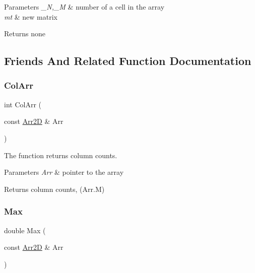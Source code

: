 \begin{DoxyParams}{Parameters}
{\em \+\_\+N,\+\_\+M} & number of a cell in the array \\
\hline
{\em mt} & new matrix \\
\hline
\end{DoxyParams}
\begin{DoxyReturn}{Returns}
none 
\end{DoxyReturn}


\subsection{Friends And Related Function Documentation}
\mbox{\label{class_arr2_d_a26461596a4c6662d3c715f23ea8ba89b}} 
\subsubsection{\texorpdfstring{Col\+Arr}{ColArr}}
{\footnotesize\ttfamily int Col\+Arr (\begin{DoxyParamCaption}\item[{const \mbox{\hyperlink{class_arr2_d}{Arr2D}} \&}]{Arr }\end{DoxyParamCaption})\hspace{0.3cm}{\ttfamily [friend]}}



The function returns column counts. 


\begin{DoxyParams}{Parameters}
{\em Arr} & pointer to the array \\
\hline
\end{DoxyParams}
\begin{DoxyReturn}{Returns}
column counts, (Arr.\+M) 
\end{DoxyReturn}
\mbox{\label{class_arr2_d_a4a5ec0331f3df137656a3a959b40112b}} 
\subsubsection{\texorpdfstring{Max}{Max}}
{\footnotesize\ttfamily double Max (\begin{DoxyParamCaption}\item[{const \mbox{\hyperlink{class_arr2_d}{Arr2D}} \&}]{Arr }\end{DoxyParamCaption})\hspace{0.3cm}{\ttfamily [friend]}}



